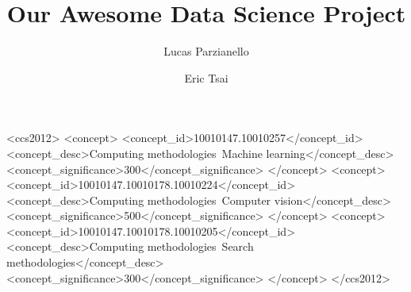 \title[Data Science Project]{Our Awesome Data Science Project}


\author{Lucas Parzianello}


\author{Eric Tsai}

\renewcommand{\shortauthors}{Parzianello, Abraham, and Tsai.}

\begin{abstract}
  \lipsum[9]
\end{abstract}

\begin{CCSXML}
<ccs2012>
<concept>
<concept_id>10010147.10010257</concept_id>
<concept_desc>Computing methodologies~Machine learning</concept_desc>
<concept_significance>300</concept_significance>
</concept>
<concept>
<concept_id>10010147.10010178.10010224</concept_id>
<concept_desc>Computing methodologies~Computer vision</concept_desc>
<concept_significance>500</concept_significance>
</concept>
<concept>
<concept_id>10010147.10010178.10010205</concept_id>
<concept_desc>Computing methodologies~Search methodologies</concept_desc>
<concept_significance>300</concept_significance>
</concept>
</ccs2012>
\end{CCSXML}

